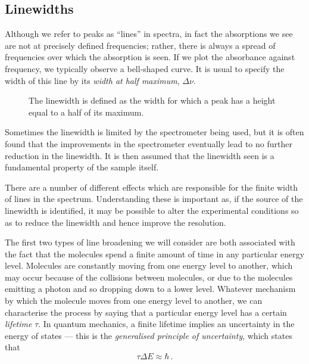 \documentclass{article}
\theoremstyle{plain}\theoremheaderfont{\normalfont\itshape}\theorembodyfont{\rmfamily}\theoremseparator{.}\newtheorem*{rem}{Remark}\newtheorem*{ex}{Example}\newtheorem*{proof}{Proof}\newtheorem*{altp}{Alternative proof}
\theoremstyle{plain}\theoremheaderfont{\normalfont\bfseries}\theorembodyfont{\rmfamily}\theoremseparator{.}\newtheorem{thm}{Theorem}[section]\newtheorem{lem}[thm]{Lemma}\newtheorem{prop}[thm]{Proposition}\newtheorem*{cor}{Corollary}\newtheorem{defn}[thm]{Definition}\newtheorem{clm}[thm]{Claim}\newtheorem{clminproof}{Claim}\newtheorem{pos}{Postulate}[section]
\theoremstyle{break}\theoremheaderfont{\normalfont\itshape}\theorembodyfont{\rmfamily}\theoremseparator{.\medskip}\newtheorem*{proofskip}{Proof}\newtheorem*{exs}{Examples}\newtheorem*{rems}{Remarks}
\theoremstyle{break}\theoremheaderfont{\normalfont\bfseries}\theorembodyfont{\rmfamily}\theoremseparator{.\medskip}\newtheorem{lemskip}[thm]{Lemma}\newtheorem{defnskip}[thm]{Definition}\newtheorem{propskip}[thm]{Proposition}\newtheorem{thmskip}[thm]{Theorem}
\numberwithin{equation}{section}
\begin{document}
    \subsection{Linewidths}
    Although we refer to peaks as ``lines'' in spectra, in fact the absorptions we see are not at precisely defined frequencies; rather, there is always a spread of frequencies over which the absorption is seen. If we plot the absorbance against frequency, we typically observe a bell-shaped curve. It is usual to specify the width of this line by its \textit{width at half maximum}, \(\Delta\nu\).
    \begin{figure}[ht!]
        \centering
        \caption{The linewidth is defined as the width for which a peak has a height equal to a half of its maximum.}
    \end{figure}

    Sometimes the linewidth is limited by the spectrometer being used, but it is often found that the improvements in the spectrometer eventually lead to no further reduction in the linewidth. It is then assumed that the linewidth seen is a fundamental property of the sample itself.

    There are a number of different effects which are responsible for the finite width of lines in the spectrum. Understanding these is important as, if the source of the linewidth is identified, it may be possible to alter the experimental conditions so as to reduce the linewidth and hence improve the resolution.

    The first two types of line broadening we will consider are both associated with the fact that the molecules spend a finite amount of time in any particular energy level. Molecules are constantly moving from one energy level to another, which may occur because of the collisions between molecules, or due to the molecules emitting a photon and so dropping down to a lower level. Whatever mechanism by which the molecule moves from one energy level to another, we can characterise the process by saying that a particular energy level has a certain \textit{lifetime} \(\tau\). In quantum mechanics, a finite lifetime implies an uncertainty in the energy of states --- this is the \textit{generalised principle of uncertainty}, which states that
    \begin{equation}\label{energy_uncertainty}
        \tau\Delta E\approx\hbar\,.
    \end{equation}
\end{document}
